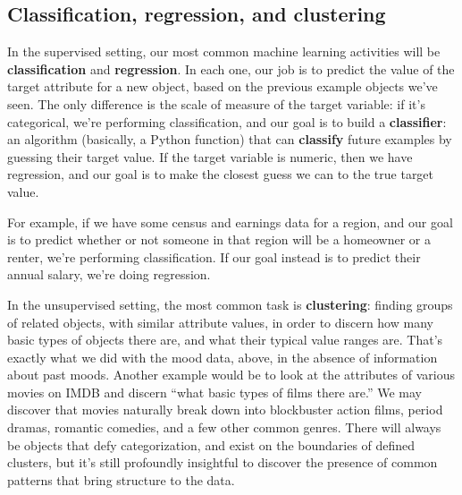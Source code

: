 \subsection{Classification, regression, and clustering}


In the supervised setting, our most common machine learning activities will be
\textbf{classification} and \textbf{regression}. In each one, our job is to
predict the value of the target attribute for a new object, based on the
previous example objects we've seen. The only difference is the scale of
measure of the target variable: if it's categorical, we're performing
classification, and our goal is to build a \textbf{classifier}: an algorithm
(basically, a Python function) that can \textbf{classify} future examples by
guessing their target value. If the target variable is numeric, then we have
regression, and our goal is to make the closest guess we can to the true target
value.

For example, if we have some census and earnings data for a region, and our
goal is to predict whether or not someone in that region will be a homeowner or
a renter, we're performing classification. If our goal instead is to predict
their annual salary, we're doing regression.


In the unsupervised setting, the most common task is \textbf{clustering}:
finding groups of related objects, with similar attribute values, in order to
discern how many basic types of objects there are, and what their typical value
ranges are. That's exactly what we did with the mood data, above, in the
absence of information about past moods. Another example would be to look at
the attributes of various movies on IMDB and discern ``what basic types of
films there are.'' We may discover that movies naturally break down into
blockbuster action films, period dramas, romantic comedies, and a few other
common genres. There will always be objects that defy categorization, and exist
on the boundaries of defined clusters, but it's still profoundly insightful to
discover the presence of common patterns that bring structure to the data.
